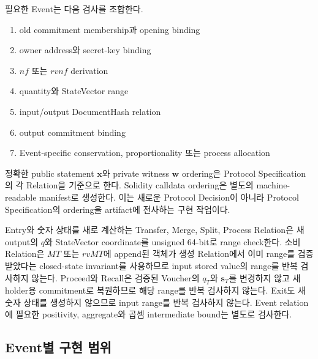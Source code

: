 \documentclass[11pt,a4paper]{extarticle}
\begin{document}
필요한 Event는 다음 검사를 조합한다.

\begin{enumerate}
  \item old commitment membership과 opening binding
  \item owner address와 secret-key binding
  \item $nf$ 또는 $rvnf$ derivation
  \item quantity와 StateVector range
  \item input/output DocumentHash relation
  \item output commitment binding
  \item Event-specific conservation, proportionality 또는 process allocation
\end{enumerate}

정확한 public statement $\mathbf{x}$와 private witness $\mathbf{w}$ ordering은 Protocol
Specification의 각 Relation을 기준으로 한다. Solidity calldata ordering은 별도의
machine-readable manifest로 생성한다. 이는 새로운 Protocol Decision이 아니라
Protocol Specification의 ordering을 artifact에 전사하는 구현 작업이다.

Entry와 숫자 상태를 새로 계산하는 Transfer, Merge, Split, Process Relation은 새 output의
$q$와 StateVector coordinate를 unsigned 64-bit로 range check한다. 소비 Relation은
$MT$ 또는 $rvMT$에 append된 객체가 생성 Relation에서 이미 range를 검증받았다는
closed-state invariant를 사용하므로 input stored value의 range를 반복 검사하지 않는다.
Proceed와 Recall은 검증된 Voucher의 $q_T$와 $\mathbf{s}_T$를 변경하지 않고 새 holder용
commitment로 복원하므로 해당 range를 반복 검사하지 않는다. Exit도 새 숫자 상태를
생성하지 않으므로 input range를 반복 검사하지 않는다. Event relation에 필요한 positivity,
aggregate와 곱셈 intermediate bound는 별도로 검사한다.

\subsection{Event별 구현 범위}
\end{document}
